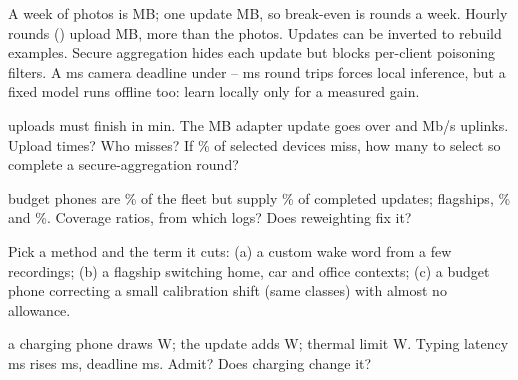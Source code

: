 \documentclass{studysheet}
\begin{document}
\begin{rightcol}
%
  {A week of photos is  MB; one update  MB, so break-even is  rounds a week.
   Hourly rounds () upload  MB, more than the photos.}{}
%
  {Updates can be inverted to rebuild examples. Secure aggregation hides each update but blocks per-client
   poisoning filters.}{}
%
  {A  ms camera deadline under -- ms round trips forces local inference, but a fixed
   model runs offline too: learn locally only for a measured gain.}{}

\vspace{2pt}
\begin{qs}
\item \assumed{} uploads must finish in  min. The  MB adapter update
  goes over  and  Mb/s uplinks. Upload times? Who misses?
  If \% of selected devices miss, how many to select so  complete a secure-aggregation round?
\item \assumed{} budget phones are \% of the fleet but supply \% of completed updates;
  flagships, \% and \%. Coverage ratios, from which logs? Does reweighting fix it?
\item Pick a method and the term it cuts: (a) a custom wake word from a few recordings; (b) a flagship switching
  home, car and office contexts; (c) a budget phone correcting a small calibration shift (same classes) with almost no allowance.
\item \assumed{} a charging phone draws  W; the update adds  W; thermal limit
   W. Typing latency  ms rises  ms, deadline  ms. Admit? Does charging change it?
\end{qs}
\end{rightcol}
\end{document}
